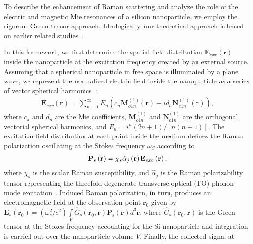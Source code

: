             To describe the enhancement of Raman scattering and analyze the role of the electric and magnetic
        Mie resonances of a silicon nanoparticle, we employ the rigorous Green tensor approach. Ideologically,
        our theoretical approach is based on earlier related studies~\cite{canccado2014theory, murphy1983enhanced}.

        In this framework, we first determine the spatial field distribution $\mathbf{E}_{exc}(\mathbf{r})$
        inside the nanoparticle at the excitation frequency created by an external source. Assuming that a
        spherical nanoparticle in free space is illuminated by a plane wave, we represent the normalized
        electric field inside the nanoparticle as a series of vector spherical harmonics~\cite{bohren1983absorption}:
        \begin{align}
            \mathbf{E}_{exc}(\mathbf{r})=\sum\nolimits_{n=1}^\infty E_n \left(c_n\mathbf{M}_{o1n}^{(1)}(\mathbf{r}) -
            i{d_n}\mathbf{N}_{e1n}^{(1)}(\mathbf{r})\right) ,
            \label{eq1}
        \end{align}
        where $c_n$ and $d_n$ are the Mie coefficients, ${{\mathbf{M}}_{o1n}^{(1)}}$ and ${{\mathbf{N}}_{e1n}^{(1)}}$ are
        the orthogonal vectorial spherical harmonics, and ${E_n} = {i^n}(2n + 1)/[n(n + 1)]$. The excitation field distribution
        at each point inside the medium defines the Raman polarization oscillating at the Stokes frequency $\omega_S$ according to
        \begin{align}
            {{\bf{P}}_s}\left( {\bf{r}} \right) = {\chi _s}\hat \alpha_j \left( {\bf{r}} \right){{\bf{E}}_{exc}}\left( {\bf{r}} \right),
            \label{eq2}
        \end{align}
        where $\chi_s$ is the scalar Raman susceptibility, and $\hat \alpha_j$ is the Raman polarizability tensor representing
        the threefold degenerate transverse optical (TO) phonon mode excitation~\cite{ralston1970spontaneous, peter2010fundamentals}.
        Induced Raman polarization, in turn, produces an electromagnetic field at the observation point
        $\mathbf{r}_0$ given by $\mathbf{E}_s(\mathbf{r}_0) = (\omega_s^2/c^2)\int\limits_V {{{\hat G}_s}\left( {{{\mathbf{r}}_0},{\mathbf{r}}} \right){{\mathbf{P}}_s}\left( {\mathbf{r}} \right){d^3}{\mathbf{r}}}$,
        where  ${\hat G_s}\left( {{{\mathbf{r}}_0},{\mathbf{r}}} \right)$ is the Green tensor at the Stokes frequency accounting
        for the Si nanoparticle and integration is carried out over the nanoparticle volume $V$. Finally, the collected signal at
